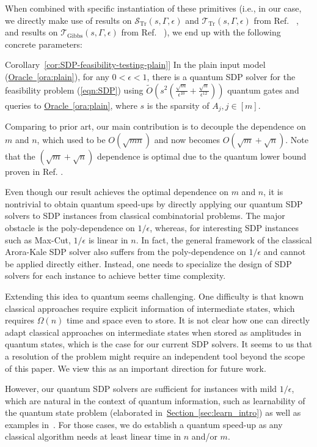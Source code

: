 \documentclass[a4paper,UKenglish,cleveref, autoref]{lipics-v2019}
\theoremstyle{remark}
\numberwithin{equation}{section}
\numberwithin{oracle}{section}
\numberwithin{remark}{section}
\newcommand{\ora}[1]{\hyperref[ora:#1]{Oracle~\ref*{ora:#1}}}
\newcommand{\cor}[1]{\hyperref[cor:#1]{Corollary~\ref*{cor:#1}}}
\renewcommand{\sec}[1]{\hyperref[sec:#1]{Section~\ref*{sec:#1}}}
\newcommand{\eps}{\varepsilon}
\DeclareMathOperator{\tr}{Tr}
\def \eps {\epsilon}
\begin{document}
When combined with specific instantiation of these primitives (i.e., in our case, we directly make use of results on $\mathcal{S}_{\tr}(s,\Gamma,\epsilon)$ and $\mathcal{T}_{\tr}(s,\Gamma,\epsilon)$ from Ref. ~\cite{brandao2016quantum}, and results on $\mathcal{T}_{\text{Gibbs}}(s,\Gamma,\epsilon)$ from Ref. ~\cite{poulin2009sampling}), we end up with the following concrete parameters:

\begin{corollary}[informal; see \cor{SDP-feasibility-testing-plain}] \label{cor:SDP-feasibility-testing-plain-intro}
In the plain input model (\ora{plain}), for any $0<\eps<1$, there is a quantum SDP solver for the feasibility problem (\ref{eqn:SDP}) using $\tilde{O}(s^2(\frac{\sqrt{m}}{\epsilon^{10}}+\frac{\sqrt{n}}{\epsilon^{12}}))$ quantum gates and queries to \ora{plain}, where $s$ is the sparsity of $A_{j}, j \in [m]$.
\end{corollary}

Comparing to prior art, our main contribution is to decouple the dependence on $m$ and $n$, which used to be $O(\sqrt{mn})$ and now becomes $O(\sqrt{m} +\sqrt{n})$. Note that the $(\sqrt{m}+\sqrt{n})$ dependence is optimal due to the quantum lower bound proven in Ref. \cite{brandao2016quantum}.

\begin{remark}
Even though our result achieves the optimal dependence on $m$ and $n$, it is nontrivial to obtain quantum speed-ups by directly applying our quantum SDP solvers to SDP instances from classical combinatorial problems. The major obstacle is the poly-dependence on $1/\eps$, whereas, for interesting SDP instances such as Max-Cut,  $1/\eps$ is linear in $n$. In fact, the general framework of the classical Arora-Kale SDP solver also suffers from the poly-dependence on $1/\eps$ and cannot be applied directly either. Instead, one needs to specialize the design of SDP solvers for each instance to achieve better time complexity. 

Extending this idea to quantum seems challenging. One difficulty is that known classical approaches require explicit information of intermediate states, which requires $\Omega(n)$ time and space even to store.  It is not clear how one can directly adapt classical approaches on intermediate states when stored as amplitudes in quantum states, which is the case for our current SDP solvers. It seems to us that a resolution of the problem might require an independent tool beyond the scope of this paper. We view this as an important direction for future work. 

However, our quantum SDP solvers are sufficient for instances with mild $1/\eps$, which are natural in the context of quantum information, such as learnability of the quantum state problem (elaborated in~\sec{learn_intro}) as well as examples in~\cite{vAG18}. For those cases, we do establish a quantum speed-up as any classical algorithm needs at least linear time in $n$ and/or $m$. 
\end{remark}
\end{document}

